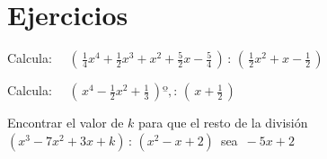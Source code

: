
\section{Ejercicios}
\vspace{0.5cm}

\begin{mipropuesto}

Calcula: $\quad \left( \, \frac 1 4 x^4+\frac 1 2 x^3+x^2+\frac 5 2 x -\frac 5 4 \, \right) \, : \, \left(\, \frac 1 2 x^2+x-\frac 1 2 \, \right)$
\end{mipropuesto}

\vspace{-8mm}
\begin{flushright}
	\begin{footnotesize} \textcolor{gris}{}	\end{footnotesize}
\end{flushright}

\begin{mipropuesto}

Calcula: $\quad \left( \, x^4-\frac 1 2 x^2+\frac 1 3 \, \right) º, : \, \left( \, x+\frac 1 2 \, \right)$ 
\end{mipropuesto}

\vspace{-8mm}
\begin{flushright}
	\begin{footnotesize} \textcolor{gris}{}	\end{footnotesize}
\end{flushright}


\begin{mipropuesto}

Encontrar el valor de $k$ para que el resto de la división $(x^3-7x^2+3x+k)\, : \, (x^2-x+2)\, $ sea $\, -5x+2$
\end{mipropuesto}

\vspace{-8mm}
\begin{flushright}
	\begin{footnotesize} \textcolor{gris}{}	\end{footnotesize}
\end{flushright}

